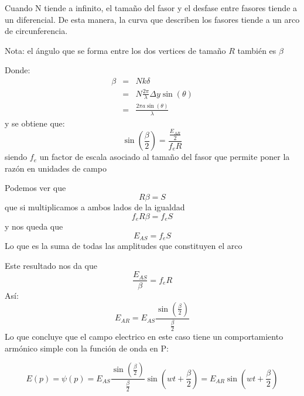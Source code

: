 \documentclass{article}
\begin{document}
        Cuando N tiende a infinito, el tamaño del fasor y el desfase
        entre fasores tiende a un diferencial. De esta manera, la curva
        que describen los fasores tiende a un arco de circunferencia.

        \begin{center}
        \end{center}

        Nota: el ángulo que se forma entre los dos vertices de tamaño $R$ también es $\beta$ 

        Donde:
        \begin{eqnarray}
            \beta &=& Nk\delta \\
            &=& N\frac{2\pi}{\lambda}\Delta y \sin(\theta) \\
            &=& \frac{2\pi a \sin(\theta)}{\lambda} 
        \end{eqnarray}
        y se obtiene que:
        \[\sin(\frac{\beta}{2}) = \frac{\frac{E_{AR}}{2}}{f_eR}\]
        siendo $f_e$ un factor de escala asociado al tamaño 
        del fasor que permite poner la razón en unidades de campo

        Podemos ver que 
        \[R\beta = S\]
        que si multiplicamos a ambos lados de la igualdad 
        \[f_eR\beta = f_eS\]
        y nos queda que 
        \[E_{AS} = f_eS\]
        Lo que es la suma de todas las amplitudes que constituyen el arco

        Este resultado nos da que 
        \[\frac{E_{AS}}{\beta}=f_eR\]
        Así:
        \[E_{AR} = E_{AS}\frac{\sin(\frac{\beta}{2})}{\frac{\beta}{2}}\]
        Lo que concluye que el campo electrico en este caso 
        tiene un comportamiento 
        armónico simple con la función de onda en P:

        \[E(p) = \psi(p) = 
        E_{AS}\frac{\sin(\frac{\beta}{2})}{\frac{\beta}{2}}\sin(wt+\frac{\beta}{2})
        = E_{AR}\sin(wt+\frac{\beta}{2})\]
\end{document}
